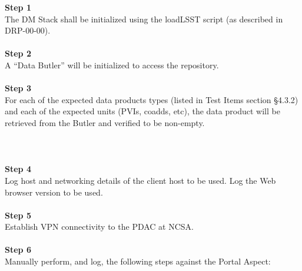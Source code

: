 \textbf{Step 1}\\
The DM Stack shall be initialized using the loadLSST script (as
described in DRP-00-00).\\
~\\
\textbf{Step 2}\\
A ``Data Butler'' will be initialized to access the repository.\\
~\\
\textbf{Step 3}\\
For each of the expected data products types (listed in Test Items
section §4.3.2) and each of the expected units (PVIs, coadds, etc), the
data product will be retrieved from the Butler and verified to be
non-empty.\\
~\\
~\\
~\\
\textbf{Step 4}\\
Log host and networking details of the client host to be used. Log the
Web browser version to be used.\\
~\\
\textbf{Step 5}\\
Establish VPN connectivity to the PDAC at NCSA.\\
~\\
\textbf{Step 6}\\
Manually perform, and log, the following steps against the Portal
Aspect:

